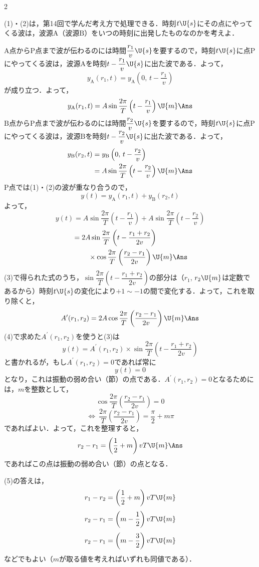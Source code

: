 \begin{multicols}{2}
\begin{sisin}
(1)・(2)は，第14回で学んだ考え方で処理できる．時刻$t\U{s}$にその点にやってくる波は，波源$\mathrm{A}$（波源$\mathrm{B}$）をいつの時刻に出発したものなのかを考えよ．
\end{sisin}
\KaiHead
\begin{komon}
 $\mathrm{A}$点から$\mathrm{P}$点まで波が伝わるのには時間$\dfrac{r_1}{v}\U{s}$を要するので，時刻$t\U{s}$に点$\mathrm{P}$にやってくる波は，波源$\mathrm{A}$を時刻$t-\dfrac{r_1}{v}\U{s}$に出た波である．よって，
       \[y_\mathrm{A}(r_1,t)=y_\mathrm{A}\left(0,\,t-\frac{r_1}{v}\right)\]
       が成り立つ．よって，
       \[y_\mathrm{A}(r_1,t)=A\sin\frac{2\pi}{T}\left(t-\frac{r_1}{v}\right)\U{m}\Ans\]
 $\mathrm{B}$点から$\mathrm{P}$点まで波が伝わるのには時間$\dfrac{r_2}{v}\U{s}$を要するので，時刻$t\U{s}$に点$\mathrm{P}$にやってくる波は，波源$\mathrm{B}$を時刻$t-\dfrac{r_2}{v}\U{s}$に出た波である．よって，
       \[\begin{aligned}y_\mathrm{B}(r_2,t)&=y_\mathrm{B}\left(0,\,t-\frac{r_2}{v}\right)\\&=A\sin\frac{2\pi}{T}\left(t-\frac{r_2}{v}\right)\U{m}\Ans\end{aligned}\]
 $\mathrm{P}$点では(1)・(2)の波が重なり合うので，
       \[y(t)=y_\mathrm{A}(r_1,t)+y_\mathrm{B}(r_2,t)\]
       よって，
       \[y(t)=A\sin\frac{2\pi}{T}\left(t-\frac{r_1}{v}\right)+A\sin\frac{2\pi}{T}\left(t-\frac{r_2}{v}\right)\]
       \[\begin{aligned}&=2A\sin\frac{2\pi}{T}\left(t-\frac{r_1+r_2}{2v}\right)\\&\hspace{8mm}\times\cos\frac{2\pi}{T}\left(\frac{r_2-r_1}{2v}\right)\U{m}\Ans\end{aligned}\]
 (3)で得られた式のうち，$\sin\dfrac{2\pi}{T}\left(t-\dfrac{r_1+r_2}{2v}\right)$の部分は（$r_1$, $r_2\U{m}$は定数であるから）時刻$t\U{s}$の変化により$+1\sim-1$の間で変化する．よって，これを取り除くと，
       \[A^\prime(r_1,r_2)=2A\cos\frac{2\pi}{T}\left(\frac{r_2-r_1}{2v}\right)\U{m}\Ans\]
 (4)で求めた$A^\prime(r_1,r_2)$を使うと(3)は
       \[y(t)=A^\prime(r_1,r_2)\times\sin\frac{2\pi}{T}\left(t-\frac{r_1+r_2}{2v}\right)\]
       と書かれるが，もし$A^\prime(r_1,r_2)=0$であれば常に
       \[y(t)=0\]
       となり，これは振動の弱め合い（節）の点である．$A^\prime(r_1,r_2)=0$となるためには，$m$を整数として，
       \[\cos\frac{2\pi}{T}\left(\frac{r_2-r_1}{2v}\right)=0\]
       \[\Leftrightarrow\ \frac{2\pi}{T}\left(\frac{r_2-r_1}{2v}\right)=\frac{\pi}{2}+m\pi\]
       であればよい．よって，これを整理すると，
       \[r_2-r_1=\left(\frac{1}{2}+m\right)vT\U{m}\Ans\]
       であればこの点は振動の弱め合い（節）の点となる．
\end{komon}
\begin{chuu}
(5)の答えは，
\[r_1-r_2=\left(\frac{1}{2}+m\right)vT\U{m}\]
\[r_2-r_1=\left(m-\frac{1}{2}\right)vT\U{m}\]
\[r_2-r_1=\left(m-\frac{3}{2}\right)vT\U{m}\]
などでもよい（$m$が取る値を考えればいずれも同値である）．


\end{chuu}
\end{multicols}
